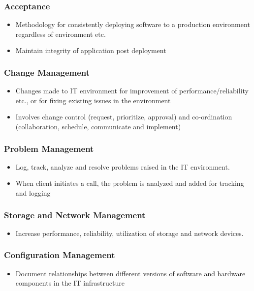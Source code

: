 \documentclass{article}
\begin{document}
\subsubsection{Acceptance}
\begin{itemize}
    \item Methodology for consistently deploying software to a production environment regardless of environment etc.
    
    \item Maintain integrity of application post deployment
\end{itemize}

\subsubsection{Change Management}
\begin{itemize}
    \item Changes made to IT environment for improvement of performance/reliability etc., or for fixing existing issues in the environment
    
    \item Involves change control (request, prioritize, approval) and co-ordination (collaboration, schedule, communicate and implement)
\end{itemize}

\subsubsection{Problem Management}
\begin{itemize}
    \item Log, track, analyze and resolve problems raised in the IT environment.
    
    \item When client initiates a call, the problem is analyzed and added for tracking and logging
\end{itemize}

\subsubsection{Storage and Network Management}
\begin{itemize}
    \item Increase performance, reliability, utilization of storage and network devices.
\end{itemize}

\subsubsection{Configuration Management}
\begin{itemize}
    \item Document relationships between different versions of software and hardware components in the IT infrastructure
\end{itemize}
\end{document}
